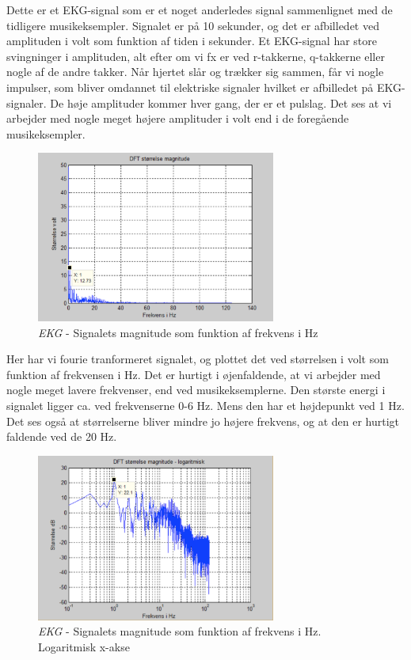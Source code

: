 Dette er et EKG-signal som er et noget anderledes signal sammenlignet med de tidligere musikeksempler. Signalet er på 10 sekunder, og det er afbilledet ved amplituden i volt som funktion af tiden i sekunder. Et EKG-signal har store svingninger i amplituden, alt efter om vi fx er ved r-takkerne, q-takkerne eller nogle af de andre takker. Når hjertet slår og trækker sig sammen, får vi nogle impulser, som bliver omdannet til elektriske signaler hvilket er afbilledet på EKG-signaler. De høje amplituder kommer hver gang, der er et pulslag. Det ses at vi arbejder med nogle meget højere amplituder i volt end i de foregående musikeksempler. 

\begin{figure}[H]
	\centering
	\includegraphics[width=0.7\textwidth]{Figurer/EKG2}
	\caption{\textit{EKG} - Signalets magnitude som funktion af frekvens i Hz}
\end{figure}

Her har vi fourie tranformeret signalet, og plottet det ved størrelsen i volt som funktion af frekvensen i Hz. Det er hurtigt i øjenfaldende, at vi arbejder med nogle meget lavere frekvenser, end ved musikeksemplerne. Den største energi i signalet ligger ca. ved frekvenserne 0-6 Hz. Mens den har et højdepunkt ved 1 Hz. Det ses også at størrelserne bliver mindre jo højere frekvens, og at den er hurtigt faldende ved de 20 Hz. 

\begin{figure}[H]
	\centering
	\includegraphics[width=0.7\textwidth]{Figurer/EKG3}
	\caption{\textit{EKG} - Signalets magnitude som funktion af frekvens i Hz. Logaritmisk x-akse}
\end{figure}

